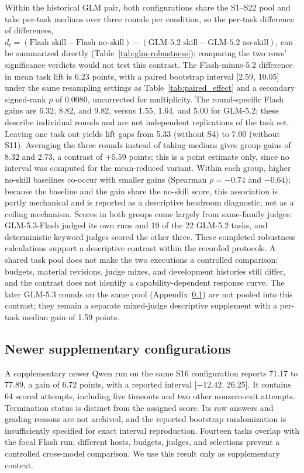 \documentclass[11pt]{article}
\begin{document}
Within the historical GLM pair, both configurations share the S1--S22 pool and take per-task medians over three rounds per condition, so the per-task difference of differences, $d_t = (\text{Flash skill} - \text{Flash no-skill}) - (\text{GLM-5.2 skill} - \text{GLM-5.2 no-skill})$, can be summarized directly (Table~\ref{tab:glm-robustness}); comparing the two rows' significance verdicts would not test this contrast. The Flash-minus-5.2 difference in mean task lift is 6.23 points, with a paired bootstrap interval [2.59, 10.05] under the same resampling settings as Table~\ref{tab:paired_effect} and a secondary signed-rank $p$ of 0.0080, uncorrected for multiplicity. The round-specific Flash gains are 6.32, 8.82, and 9.82, versus 1.55, 1.64, and 5.00 for GLM-5.2; these describe individual rounds and are not independent replications of the task set. Leaving one task out yields lift gaps from 5.33 (without S4) to 7.00 (without S11). Averaging the three rounds instead of taking medians gives group gains of 8.32 and 2.73, a contrast of $+5.59$ points; this is a point estimate only, since no interval was computed for the mean-reduced variant. Within each group, higher no-skill baselines co-occur with smaller gains (Spearman $\rho = -0.74$ and $-0.64$); because the baseline and the gain share the no-skill score, this association is partly mechanical and is reported as a descriptive headroom diagnostic, not as a ceiling mechanism. Scores in both groups come largely from same-family judges: GLM-5.3-Flash judged its own runs and 19 of the 22 GLM-5.2 tasks, and deterministic keyword judges scored the other three. These completed robustness calculations support a descriptive contrast within the recorded protocols. A shared task pool does not make the two executions a controlled comparison: budgets, material revisions, judge mixes, and development histories still differ, and the contrast does not identify a capability-dependent response curve. The later GLM-5.3 rounds on the same pool (Appendix~\ref{app:supplementary}) are not pooled into this contrast; they remain a separate mixed-judge descriptive supplement with a per-task median gain of 1.59 points.



\subsection{Newer supplementary configurations}\label{app:supplementary}
A supplementary newer Qwen run on the same S16 configuration reports 71.17 to 77.89, a gain of 6.72 points, with a reported interval [$-12.42$, 26.25]. It contains 64 scored attempts, including five timeouts and two other nonzero-exit attempts. Termination status is distinct from the assigned score. Its raw answers and grading reasons are not archived, and the reported bootstrap randomization is insufficiently specified for exact interval reproduction. Fourteen tasks overlap with the focal Flash run; different hosts, budgets, judges, and selections prevent a controlled cross-model comparison. We use this result only as supplementary context.
\end{document}
